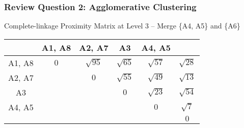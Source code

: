 \documentclass[aspectratio=169, 10pt]{beamer}
\begin{document}
\begin{frame}[t]
    \frametitle{Review Question 2: Agglomerative Clustering}
    \small

    Complete-linkage Proximity Matrix at Level 3 -- Merge \{A4, A5\} and \{A6\}

    \begin{table}[]
        \scriptsize
        \begin{tabular}{c|ccccc}
        \cellcolor[HTML]{FFFFFF}{\color[HTML]{000000} } & {\color[HTML]{000000} A1, A8} & {\color[HTML]{000000} A2, A7}      & {\color[HTML]{000000} A3}          & {\color[HTML]{000000} A4, A5}      & \cellcolor[HTML]{9B9B9B}{\color[HTML]{000000} A6}          \\ \hline
        {\color[HTML]{000000} A1, A8}                   & {\color[HTML]{000000} $0$}    & {\color[HTML]{000000} $\sqrt{95}$} & {\color[HTML]{000000} $\sqrt{65}$} & {\color[HTML]{3531FF} $\sqrt{57}$} & {\color[HTML]{9b9b9b} $\sqrt{28}$} \\
        {\color[HTML]{000000} A2, A7}                   & {\color[HTML]{000000} }       & {\color[HTML]{000000} $0$}         & {\color[HTML]{000000} $\sqrt{55}$} & {\color[HTML]{3531FF} $\sqrt{49}$} & {\color[HTML]{9b9b9b} $\sqrt{13}$} \\
        {\color[HTML]{000000} A3}                       & {\color[HTML]{000000} }       & {\color[HTML]{000000} }            & {\color[HTML]{000000} $0$}         & {\color[HTML]{9b9b9b} $\sqrt{23}$} & {\color[HTML]{3531FF} $\sqrt{54}$} \\
        {\color[HTML]{000000} A4, A5}                   & {\color[HTML]{000000} }       & {\color[HTML]{000000} }            & {\color[HTML]{000000} }            & {\color[HTML]{000000} $0$}         & {\color[HTML]{9b9b9b} $\sqrt{7}$}  \\
        \cellcolor[HTML]{9B9B9B}{\color[HTML]{000000} A6}                       & {\color[HTML]{000000} }       & {\color[HTML]{000000} }            & {\color[HTML]{000000} }            & {\color[HTML]{000000} }            & {\color[HTML]{9b9b9b} $0$}        
        \end{tabular}
    \end{table}


\end{frame}
\end{document}
